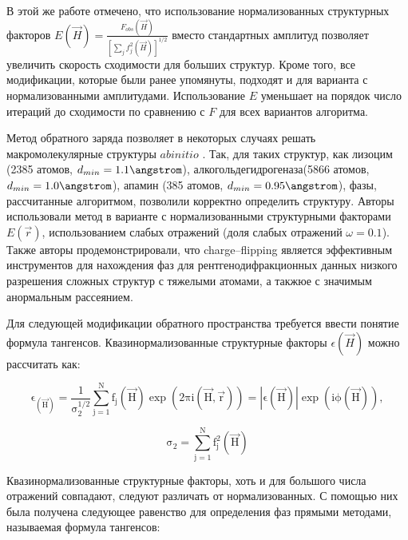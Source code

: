 В этой же работе отмечено, что использование нормализованных структурных факторов $E(\overrightarrow{H}) = \frac{F_{obs}(\overrightarrow{H})}{[\sum_j f_j^2(\overrightarrow{H})]^{1/2}}$ вместо стандартных амплитуд позволяет увеличить скорость сходимости для больших структур. Кроме того, все модификации, которые были ранее упомянуты, подходят и для варианта с нормализованными амплитудами. Использование $E$ уменьшает на порядок число итераций до сходимости по сравнению с $F$ для всех вариантов алгоритма.

Метод обратного заряда позволяет в некоторых случаях решать макромолекулярные структуры $ab initio$ \cite{dumas_macromolecular_2008}. Так, для таких структур, как лизоцим (2385 атомов, $d_{min} = 1.1\angstrom$), алкогольдегидрогеназа(5866 атомов, $d_{min} = 1.0\angstrom$), апамин (385 атомов, $d_{min} = 0.95\angstrom$), фазы, рассчитанные алгоритмом, позволили корректно определить структуру. Авторы использовали метод в варианте с нормализованными структурными факторами $E(\overrightarrow{r})$, использованием слабых отражений (доля слабых отражений $\omega = 0.1$). Также авторы продемонстрировали, что charge--flipping является эффективным инструментов для нахождения фаз для рентгенодифракционных данных низкого разрешения сложных структур с тяжелыми атомами, а такжюе с значимым анормальным рассеянием.

Для следующей модификации обратного пространства требуется ввести понятие формула тангенсов. Квазинормализованные структурные факторы $\epsilon(\overrightarrow{H})$ \cite{karle_unified_1959} можно рассчитать как:

\begin{equation}\label{eqquazi}
	\mathrm{ \epsilon_(\overrightarrow{H}) = \frac{1}{\sigma_2^{1/2}}\sum\limits_{j=1}^Nf_{j}(\overrightarrow{H})\exp(2\pi i (\overrightarrow{H}, \overrightarrow{r})) = |\epsilon(\overrightarrow{H})|\exp(i\phi(\overrightarrow{H})),
		}
\end{equation}

\begin{equation}\label{sigma}
	\mathrm{ \sigma_2 = \sum\limits_{j=1}^N f_j^2(\overrightarrow{H})
	}
\end{equation}

Квазинормализованные структурные факторы, хоть и для большого числа отражений совпадают, следуют различать от нормализованных. С помощью них была получена \cite{karle_symbolic_1966} следующее равенство для определения фаз прямыми методами, называемая формула тангенсов:

